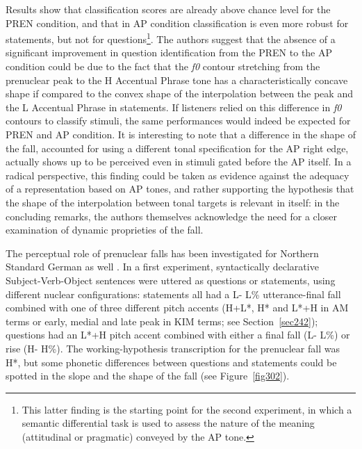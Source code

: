 Results show that classification scores are already above chance level for the PREN condition, and that in AP condition classification is even more robust for statements, but not for questions\footnote{This latter finding is the starting point for the second experiment, in which a semantic differential task is used to assess the nature of the meaning (attitudinal or pragmatic) conveyed by the AP tone.}. The authors suggest that the absence of a significant improvement in question identification from the PREN to the AP condition could be due to the fact that the \textit{f0} contour stretching from the prenuclear peak to the H Accentual Phrase tone has a characteristically concave shape if compared to the convex shape of the interpolation between the peak and the L Accentual Phrase in statements. If listeners relied on this difference in \textit{f0} contours to classify stimuli, the same performances would indeed be expected for PREN and AP condition. It is interesting to note that a difference in the shape of the fall, accounted for using a different tonal specification for the AP right edge, actually shows up to be perceived even in stimuli gated before the AP itself. In a radical perspective, this finding could be taken as evidence against the adequacy of a representation based on AP tones, and rather supporting the hypothesis that the shape of the interpolation between tonal targets is relevant in itself: in the concluding remarks, the authors themselves acknowledge the need for a closer examination of dynamic proprieties of the fall.

The perceptual role of prenuclear falls has been investigated for Northern Standard German as well \citep{petrone2014intonation}. In a first experiment, syntactically declarative Subject-Verb-Object sentences were uttered as questions or statements, using different nuclear configurations: statements all had a L- L\% utterance-final fall combined with one of three different pitch accents (H+L*, H* and L*+H in AM terms or early, medial and late peak in KIM terms; see Section~\ref{sec242}); questions had an L*+H pitch accent combined with either a final fall (L- L\%) or rise (H- H\%). The working-hypothesis transcription for the prenuclear fall was H*, but some phonetic differences between questions and statements could be spotted in the slope and the shape of the fall (see Figure~\ref{fig302}).

